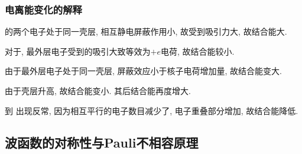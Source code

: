 \documentclass[hidelinks]{ctexart}
\begin{document}

\subsubsection{电离能变化的解释} %
\label{ssub:电离能变化的解释}

\begin{cenum}
    \item {}的两个电子处于同一壳层, 相互静电屏蔽作用小, 故受到吸引力大, 故结合能大.
    \item 对于, 最外层电子受到的吸引大致等效为$+e$电荷, 故结合能较小.
    \item {}由于最外层电子处于同一壳层, 屏蔽效应小于核子电荷增加量, 故结合能变大.
    \item {}由于壳层升高, 故结合能变小. 其后结合能再度增大. 
    \item 到 出现反常, 因为相互平行的电子数目减少了, 电子重叠部分增加, 故结合能降低.
\end{cenum}



\subsection{波函数的对称性与Pauli不相容原理} %
\label{sub:波函数的对称性与pauli不相容原理}
\end{document}
